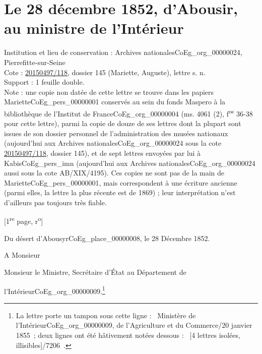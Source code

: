 \documentclass{book}
\begin{document}
\section*{Le 28 décembre 1852, d'Abousir, au ministre de l'Intérieur} \label{CoEg_Mariette_1852-12-28} 
{\footnotesize
\noindent Institution et lieu de conservation : Archives nationales\gls{CoEg_org_00000024}, Pierrefitte-sur-Seine\\
Cote : \hyperref[CoEg_Mariette_ms_001]{20150497/118}, dossier 145 (Mariette, Auguste), lettre s. n.\\
Support : 1 feuille double.\\
Note : une copie non datée de cette lettre se trouve dans les papiers Mariette\gls{CoEg_pers_00000001} conservés au sein du fonds Maspero à la bibliothèque de l'Institut de France\gls{CoEg_org_00000004} (ms. 4061 (2), f\textsuperscript{os} 36-38 pour cette lettre), parmi la copie de douze de ses lettres dont la plupart sont issues de son dossier personnel de l'administration des musées nationaux (aujourd'hui aux Archives nationales\gls{CoEg_org_00000024} sous la cote \hyperref[CoEg_Mariette_ms_001]{20150497/118}, dossier 145), et de sept lettres envoyées par lui à Kabis\gls{CoEg_pers_imn} (aujourd'hui aux Archives nationales\gls{CoEg_org_00000024} aussi sous la cote AB/XIX/4195). Ces copies ne sont pas de la main de Mariette\gls{CoEg_pers_00000001}, mais correspondent à une écriture ancienne (parmi elles, la lettre la plus récente est de 1869) ; leur interprétation n'est d'ailleurs pas toujours très fiable.
\begin{center} {[1\textsuperscript{re} page, r\textsuperscript{o}]}\end{center}}
\begin{flushright} Du désert d’Abousyr\gls{CoEg_place_00000008}, le 28 Décembre 1852.\end{flushright}
\indent A Monsieur
\begin{center}Monsieur le Ministre, Secrétaire d’État au Département de\end{center}
\begin{flushright}l’Intérieur\gls{CoEg_org_00000009}.\footnote{La lettre porte un tampon sous cette ligne : \og ~Ministère de l’Intérieur\gls{CoEg_org_00000009}, de l’Agriculture et du Commerce/20 janvier 1855~\fg ; deux lignes ont été hâtivement notées dessous : \og ~{[4 lettres isolées, illisibles]}/7206~\fg.}\end{flushright}
\end{document}
